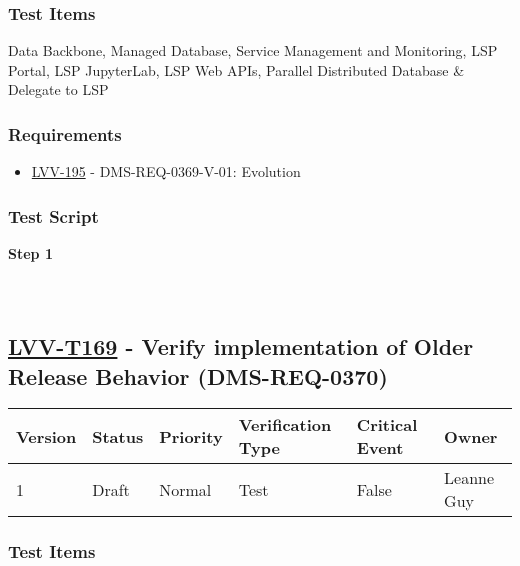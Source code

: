 \hypertarget{test-items-68}{%
\subsubsection{Test Items}\label{test-items-68}}

Data Backbone, Managed Database, Service Management and Monitoring, LSP
Portal, LSP JupyterLab, LSP Web APIs, Parallel Distributed Database \&
Delegate to LSP

\hypertarget{requirements-68}{%
\subsubsection{Requirements}\label{requirements-68}}

\begin{itemize}
\tightlist
\item
  \href{https://jira.lsstcorp.org/browse/LVV-195}{LVV-195} -
  DMS-REQ-0369-V-01: Evolution
\end{itemize}

\hypertarget{test-script-68}{%
\subsubsection{Test Script}\label{test-script-68}}

\textbf{Step 1}\\
~\\
~\\

\hypertarget{lvv-t169---verify-implementation-of-older-release-behavior-dms-req-0370}{%
\subsection{\texorpdfstring{\href{https://jira.lsstcorp.org/secure/Tests.jspa\#/testCase/LVV-T169}{LVV-T169}
- Verify implementation of Older Release Behavior
(DMS-REQ-0370)}{LVV-T169 - Verify implementation of Older Release Behavior (DMS-REQ-0370)}}\label{lvv-t169---verify-implementation-of-older-release-behavior-dms-req-0370}}

\begin{longtable}[]{@{}llllll@{}}
\toprule
Version & Status & Priority & Verification Type & Critical Event &
Owner\tabularnewline
\midrule
\endhead
1 & Draft & Normal & Test & False & Leanne Guy\tabularnewline
\bottomrule
\end{longtable}

\hypertarget{test-items-69}{%
\subsubsection{Test Items}\label{test-items-69}}

